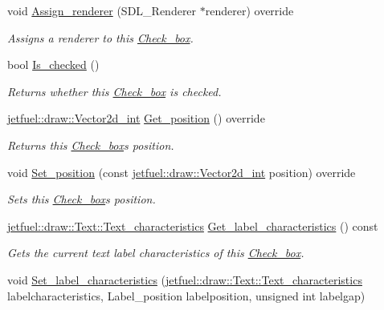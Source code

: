 \begin{DoxyCompactItemize}
void \hyperlink{classjetfuel_1_1gui_1_1Check__box_a544261fc2f2d182b73c7ea629fa35e78}{Assign\+\_\+renderer} (S\+D\+L\+\_\+\+Renderer $\ast$renderer) override
\begin{DoxyCompactList}\small\item\em Assigns a renderer to this \hyperlink{classjetfuel_1_1gui_1_1Check__box}{Check\+\_\+box}. \end{DoxyCompactList}\item 
bool \hyperlink{classjetfuel_1_1gui_1_1Check__box_a906b159264ffa88cab5d9d467331f229}{Is\+\_\+checked} ()
\begin{DoxyCompactList}\small\item\em Returns whether this \hyperlink{classjetfuel_1_1gui_1_1Check__box}{Check\+\_\+box} is checked. \end{DoxyCompactList}\item 
\hyperlink{classjetfuel_1_1draw_1_1Vector2d}{jetfuel\+::draw\+::\+Vector2d\+\_\+int} \hyperlink{classjetfuel_1_1gui_1_1Check__box_a7f14e8be560d0be5a05839442de1f18f}{Get\+\_\+position} () override
\begin{DoxyCompactList}\small\item\em Returns this \hyperlink{classjetfuel_1_1gui_1_1Check__box}{Check\+\_\+box}\textquotesingle{}s position. \end{DoxyCompactList}\item 
void \hyperlink{classjetfuel_1_1gui_1_1Check__box_aca11db17630485a2c44b19780d10cce6}{Set\+\_\+position} (const \hyperlink{classjetfuel_1_1draw_1_1Vector2d}{jetfuel\+::draw\+::\+Vector2d\+\_\+int} position) override
\begin{DoxyCompactList}\small\item\em Sets this \hyperlink{classjetfuel_1_1gui_1_1Check__box}{Check\+\_\+box}\textquotesingle{}s position. \end{DoxyCompactList}\item 
\hyperlink{structjetfuel_1_1draw_1_1Text_1_1Text__characteristics}{jetfuel\+::draw\+::\+Text\+::\+Text\+\_\+characteristics} \hyperlink{classjetfuel_1_1gui_1_1Check__box_a67e0befe8a0919bf28b5090cddac397e}{Get\+\_\+label\+\_\+characteristics} () const
\begin{DoxyCompactList}\small\item\em Gets the current text label characteristics of this \hyperlink{classjetfuel_1_1gui_1_1Check__box}{Check\+\_\+box}. \end{DoxyCompactList}\item 
void \hyperlink{classjetfuel_1_1gui_1_1Check__box_aa7dbb21f37090d3a595d0111acc721b3}{Set\+\_\+label\+\_\+characteristics} (\hyperlink{structjetfuel_1_1draw_1_1Text_1_1Text__characteristics}{jetfuel\+::draw\+::\+Text\+::\+Text\+\_\+characteristics} labelcharacteristics, Label\+\_\+position labelposition, unsigned int labelgap)

\end{DoxyCompactItemize}
